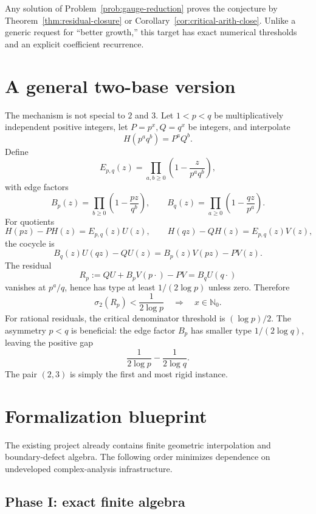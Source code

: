 \documentclass[11pt]{article}
\theoremstyle{definition}
\newcommand{\Nzero}{\mathbb N_0}
\begin{document}
Any solution of Problem~\ref{prob:gauge-reduction} proves the conjecture by Theorem~\ref{thm:residual-closure} or Corollary~\ref{cor:critical-arith-close}.  Unlike a generic request for ``better growth,'' this target has exact numerical thresholds and an explicit coefficient recurrence.

\section{A general two-base version}

The mechanism is not special to \(2\) and \(3\).  Let \(1<p<q\) be multiplicatively independent positive integers, let \(P=p^x,Q=q^x\) be integers, and interpolate
\[
  H(p^aq^b)=P^aQ^b.
\]
Define
\[
 E_{p,q}(z)=\prod_{a,b\ge0}\left(1-\frac{z}{p^aq^b}\right),
\]
with edge factors
\[
 B_p(z)=\prod_{b\ge0}\left(1-\frac{pz}{q^b}\right),
 \qquad
 B_q(z)=\prod_{a\ge0}\left(1-\frac{qz}{p^a}\right).
\]
For quotients
\[
 H(pz)-PH(z)=E_{p,q}(z)U(z),
 \qquad
 H(qz)-QH(z)=E_{p,q}(z)V(z),
\]
the cocycle is
\[
 B_q(z)U(qz)-Q U(z)=B_p(z)V(pz)-P V(z).
\]
The residual
\[
 R_p:=Q U+B_pV(p\cdot)-PV=B_qU(q\cdot)
\]
vanishes at \(p^a/q\), hence has type at least \(1/(2\log p)\) unless zero.  Therefore
\[
  \sigma_2(R_p)<\frac1{2\log p}
  \quad\Longrightarrow\quad x\in\Nzero.
\]
For rational residuals, the critical denominator threshold is \((\log p)/2\).  The asymmetry \(p<q\) is beneficial: the edge factor \(B_p\) has smaller type \(1/(2\log q)\), leaving the positive gap
\[
  \frac1{2\log p}-\frac1{2\log q}.
\]
The pair \((2,3)\) is simply the first and most rigid instance.

\section{Formalization blueprint}

The existing project already contains finite geometric interpolation and boundary-defect algebra.  The following order minimizes dependence on undeveloped complex-analysis infrastructure.

\subsection{Phase I: exact finite algebra}
\end{document}
